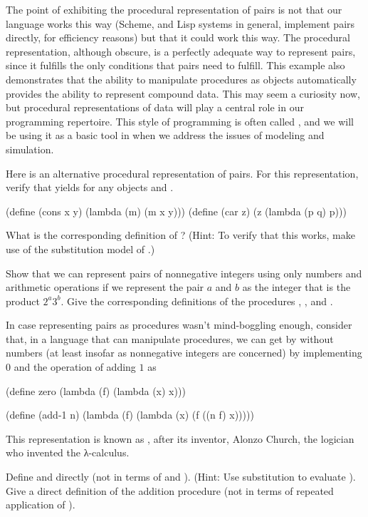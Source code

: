 The point of exhibiting the procedural representation of pairs is not that our language works this way (Scheme, and Lisp systems in general, implement pairs directly, for efficiency reasons) but that it could work this way.
The procedural representation, although obscure, is a perfectly adequate way to represent pairs, since it fulfills the only conditions that pairs need to fulfill.
This example also demonstrates that the ability to manipulate procedures as objects automatically provides the ability to represent compound data.
This may seem a curiosity now, but procedural representations of data will play a central role in our programming repertoire.
This style of programming is often called , and we will be using it as a basic tool in  when we address the issues of modeling and simulation.



\begin{exercise}
	\label{Exercise 2.4}
	Here is an alternative procedural representation of pairs.
	For this representation, verify that  yields  for any objects  and .
	\begin{scheme}
	  (define (cons x y)
	    (lambda (m) (m x y)))
	  (define (car z)
	    (z (lambda (p q) p)))
	\end{scheme}
	What is the corresponding definition of ?
	(Hint:
	To verify that this works, make use of the substitution model of .)
\end{exercise}



\begin{exercise}
	\label{Exercise 2.5}
	Show that we can represent pairs of nonnegative integers using only numbers and arithmetic operations if we represent the pair \( a \) and \( b \) as the integer that is the product \( 2^a 3^b \).
	Give the corresponding definitions of the procedures , , and .
\end{exercise}



\begin{exercise}
	\label{Exercise 2.6}
	In case representing pairs as procedures wasn’t mind-boggling enough, consider that, in a language that can manipulate procedures, we can get by without numbers (at least insofar as nonnegative integers are concerned) by implementing 0 and the operation of adding \( 1 \) as
	\begin{scheme}
	  (define zero (lambda (f) (lambda (x) x)))

	  (define (add-1 n)
	    (lambda (f) (lambda (x) (f ((n f) x)))))
	\end{scheme}
	This representation is known as , after its inventor, Alonzo Church, the logician who invented the λ-calculus.

	Define  and  directly (not in terms of  and ).
	(Hint:
	Use substitution to evaluate ).
	Give a direct definition of the addition procedure \code{+} (not in terms of repeated application of ).
\end{exercise}



